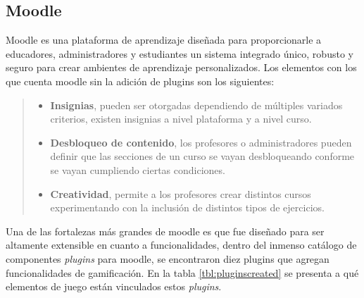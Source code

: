 \clearpage
\subsection*{Moodle}

 Moodle \cite{PagMoodle} es una plataforma de aprendizaje diseñada para proporcionarle a educadores,
 administradores y estudiantes un sistema integrado único, robusto y seguro para crear
 ambientes de aprendizaje personalizados. Los elementos con los que cuenta moodle sin
 la adición de plugins son los siguientes:

 \begin{quote}
 \begin{itemize}
    \item {\bf Insignias}, pueden ser otorgadas dependiendo de múltiples variados
                criterios, existen insignias a nivel plataforma y a nivel curso.

    \item {\bf Desbloqueo de contenido}, los profesores o administradores pueden
                definir que las secciones de un curso se vayan desbloqueando
                conforme se vayan cumpliendo ciertas condiciones.

    \item {\bf Creatividad}, permite a los profesores crear distintos cursos
                experimentando con la inclusión de distintos tipos de ejercicios.
 \end{itemize}
 \end{quote}

 \noindent Una de las fortalezas más grandes de moodle es que fue diseñado para ser altamente
 extensible en cuanto a funcionalidades, dentro del inmenso catálogo de componentes {\it plugins}
 para moodle, se encontraron diez plugins que agregan funcionalidades de gamificación. En la tabla
 \ref{tbl:pluginscreated} se presenta a qué elementos de juego están vinculados estos {\it plugins}.


